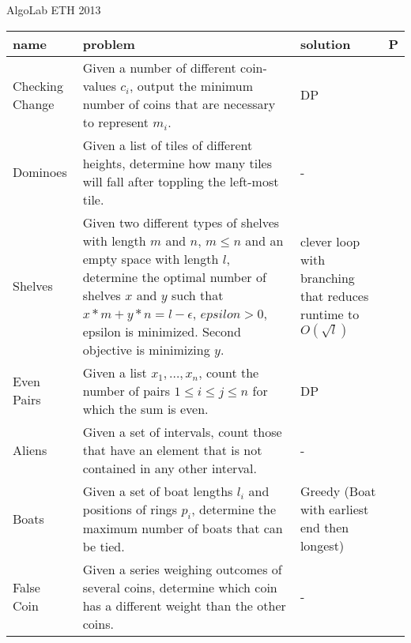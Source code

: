 \documentclass[a4paper, 10pt]{article}
\begin{document}
    \vspace*{1cm}
    \begin{center}
        {\huge AlgoLab ETH 2013}
    \end{center}
    \vspace{1cm}
    \begin{longtable}{ L{2cm} L{8cm} L{4cm} r}
        name & problem & solution & P\\
      \hline
        Checking Change 
        & Given a number of different coin-values $c_i$, 
            output the minimum number of coins that are necessary to represent $m_i$.
        & DP       & \pageref{sec:checking_change} \\

        Dominoes 
        & Given a list of tiles of different heights, determine how many tiles will
            fall after toppling the left-most tile.
        & - &  \pageref{sec:dominoes} \\

        Shelves 
        & Given two different types of shelves with length $m$ and $n$, $m\leq n$ and an empty space with length $l$,
            determine the optimal number of shelves $x$ and $y$ such that $x*m + y*n = l-\epsilon$, $epsilon>0$,
            epsilon is minimized. Second objective is minimizing $y$.
        & clever loop with branching that reduces runtime to $O(\sqrt{l})$ &  \pageref{sec:shelves} \\

        Even Pairs 
        & Given a list $x_1,\dots,x_n$, count the number of pairs $1\leq i\leq j \leq n$ for which 
            the sum is even.
        & DP &  \pageref{sec:even_pairs} \\

        Aliens
        & Given a set of intervals, count those that have an element that is not contained in any other interval. 
        & - &  \pageref{sec:aliens} \\

        Boats 
        & Given a set of boat lengths $l_i$ and positions of rings $p_i$, determine the maximum number of boats that can be tied.
        & Greedy (Boat with earliest end then longest) &  \pageref{sec:boats} \\

        False Coin 
        & Given a series weighing outcomes of several coins, determine which coin has a different weight than the other coins. 
        & - &  \pageref{sec:false_coin} \\


\end{longtable}
\end{document}
